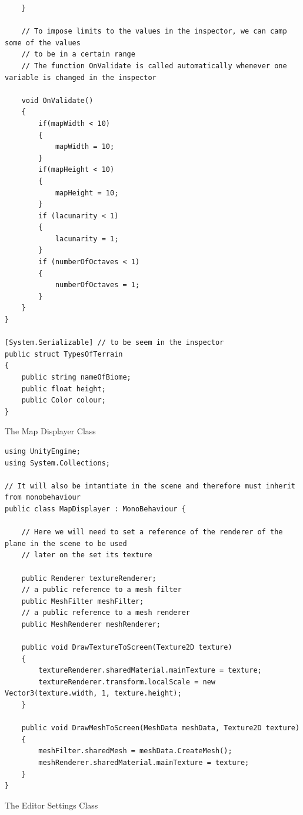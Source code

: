 \documentclass[a4paper,12pt]{book}
\begin{document}
\begin{lstlisting}
    }

    // To impose limits to the values in the inspector, we can camp some of the values
    // to be in a certain range
    // The function OnValidate is called automatically whenever one variable is changed in the inspector

    void OnValidate()
    {
        if(mapWidth < 10)
        {
            mapWidth = 10;
        }
        if(mapHeight < 10)
        {
            mapHeight = 10;
        }
        if (lacunarity < 1)
        {
            lacunarity = 1;
        }
        if (numberOfOctaves < 1)
        {
            numberOfOctaves = 1;
        }
    }	
}

[System.Serializable] // to be seem in the inspector
public struct TypesOfTerrain
{
    public string nameOfBiome;
    public float height;
    public Color colour;
}

\end{lstlisting}

The Map Displayer Class

\begin{lstlisting}
using UnityEngine;
using System.Collections;

// It will also be intantiate in the scene and therefore must inherit from monobehaviour
public class MapDisplayer : MonoBehaviour {

    // Here we will need to set a reference of the renderer of the plane in the scene to be used
    // later on the set its texture

    public Renderer textureRenderer;
    // a public reference to a mesh filter
    public MeshFilter meshFilter;
    // a public reference to a mesh renderer
    public MeshRenderer meshRenderer;

    public void DrawTextureToScreen(Texture2D texture)
    {
        textureRenderer.sharedMaterial.mainTexture = texture;
        textureRenderer.transform.localScale = new Vector3(texture.width, 1, texture.height);
    }

    public void DrawMeshToScreen(MeshData meshData, Texture2D texture)
    {
        meshFilter.sharedMesh = meshData.CreateMesh();
        meshRenderer.sharedMaterial.mainTexture = texture;
    }
}

\end{lstlisting}

The Editor Settings Class
\end{document}

